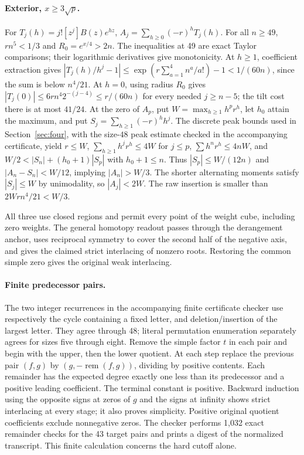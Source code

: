 \paragraph{Exterior, \(x\ge3\sqrt p\).} For \(T_j(h)=j![z^j]B(z)e^{hz}\), \(A_j=\sum_{h\ge0}(-r)^hT_j(h)\). For all \(n\ge49\), \(r n^5<1/3\) and \(R_0=e^{x/4}>2n\). The inequalities at 49 are exact Taylor comparisons; their logarithmic derivatives give monotonicity. At \(h\ge1\), coefficient extraction gives \(|T_j(h)/h^j-1|\le\exp(r\sum_{a=1}^4 n^a/a!)-1<1/(60n)\), since the sum is below \(n^4/21\). At \(h=0\), using radius \(R_0\) gives \(|T_j(0)|\le6r n^4 2^{-(j-4)}\le r/(60n)\) for every needed \(j\ge n-5\); the tilt cost there is at most \(41/24\). At the zero of \(A_p\), put \(W=\max_{h\ge1}h^pr^h\), let \(h_0\) attain the maximum, and put \(S_j=\sum_{h\ge1}(-r)^h h^j\). The discrete peak bounds used in Section~\ref{sec:four}, with the size-$48$ peak estimate checked in the accompanying certificate, yield \(r\le W\), \(\sum_{h\ge1}h^jr^h\le4W\) for \(j\le p\), \(\sum h^nr^h\le4nW\), and \(W/2<|S_n|+(h_0+1)|S_p|\) with \(h_0+1\le n\). Thus \(|S_p|\le W/(12n)\) and \(|A_n-S_n|<W/12\), implying \(|A_n|>W/3\). The shorter alternating moments satisfy \(|S_j|\le W\) by unimodality, so \(|A_j|<2W\). The raw insertion is smaller than \(2Wr n^4/21<W/3\).

All three use closed regions and permit every point of the weight cube, including zero weights. The general homotopy readout passes through the derangement anchor, uses reciprocal symmetry to cover the second half of the negative axis, and gives the claimed strict interlacing of nonzero roots. Restoring the common simple zero gives the original weak interlacing.


\paragraph{Finite predecessor pairs.}
The two integer recurrences in the accompanying finite certificate checker use respectively the cycle containing a fixed letter, and deletion/insertion of the largest letter. They agree through 48; literal permutation enumeration separately agrees for sizes five through eight. Remove the simple factor \(t\) in each pair and begin with the upper, then the lower quotient. At each step replace the previous pair \((f,g)\) by \((g,-\operatorname{rem}(f,g))\), dividing by positive contents. Each remainder has the expected degree exactly one less than its predecessor and a positive leading coefficient. The terminal constant is positive. Backward induction using the opposite signs at zeros of \(g\) and the signs at infinity shows strict interlacing at every stage; it also proves simplicity. Positive original quotient coefficients exclude nonnegative zeros. The checker performs 1,032 exact remainder checks for the 43 target pairs and prints a digest of the normalized transcript.  This finite calculation concerns the hard cutoff alone.
